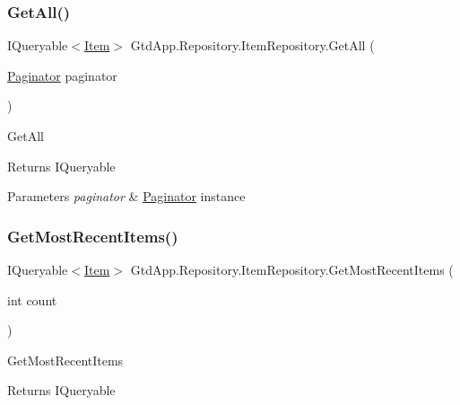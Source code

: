 \subsubsection{\texorpdfstring{Get\+All()}{GetAll()}}
{\footnotesize\ttfamily I\+Queryable$<$\mbox{\hyperlink{class_gtd_app_1_1_data_1_1_item}{Item}}$>$ Gtd\+App.\+Repository.\+Item\+Repository.\+Get\+All (\begin{DoxyParamCaption}\item[{\mbox{\hyperlink{class_gtd_app_1_1_repository_1_1_paginator}{Paginator}}}]{paginator }\end{DoxyParamCaption})}



Get\+All 

\begin{DoxyReturn}{Returns}
I\+Queryable
\end{DoxyReturn}

\begin{DoxyParams}{Parameters}
{\em paginator} & \mbox{\hyperlink{class_gtd_app_1_1_repository_1_1_paginator}{Paginator}} instance\\
\hline
\end{DoxyParams}
\mbox{\label{class_gtd_app_1_1_repository_1_1_item_repository_a321f8eb1347fa0543d08f3e1b2908d09}} 
\subsubsection{\texorpdfstring{Get\+Most\+Recent\+Items()}{GetMostRecentItems()}}
{\footnotesize\ttfamily I\+Queryable$<$\mbox{\hyperlink{class_gtd_app_1_1_data_1_1_item}{Item}}$>$ Gtd\+App.\+Repository.\+Item\+Repository.\+Get\+Most\+Recent\+Items (\begin{DoxyParamCaption}\item[{int}]{count }\end{DoxyParamCaption})}



Get\+Most\+Recent\+Items 

\begin{DoxyReturn}{Returns}
I\+Queryable
\end{DoxyReturn}

